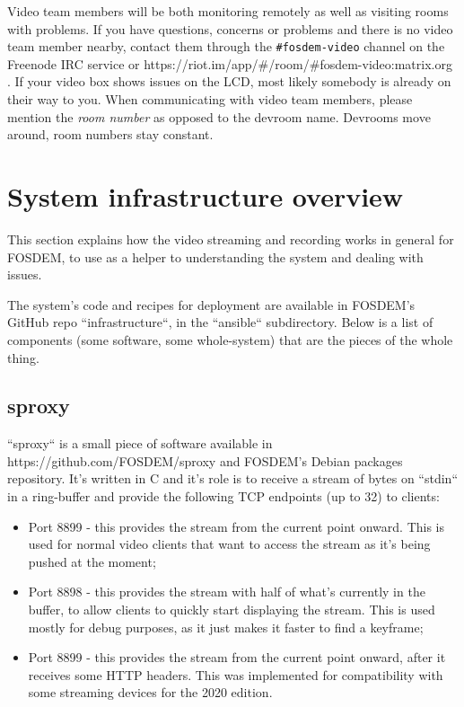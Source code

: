 \documentclass{article}
\begin{document}
Video team members will be both monitoring remotely as well as visiting rooms with problems. If you have questions, concerns or problems and there is no video team member nearby, contact them through the \texttt{\#fosdem-video} channel on the Freenode IRC service or https://riot.im/app/\#/room/\#fosdem-video:matrix.org . If your video box shows issues on the LCD, most likely somebody is already on their way to you. When communicating with video team members, please mention the \emph{room number} as opposed to the devroom name. Devrooms move around, room numbers stay constant.

\section{System infrastructure overview}

This section explains how the video streaming and recording works in general for FOSDEM, to use as a helper to understanding the system and dealing with issues.

The system's code and recipes for deployment are available in FOSDEM's GitHub repo ``infrastructure``, in the ``ansible`` subdirectory. Below is a list of components (some software, some whole-system) that are the pieces of the whole thing.

\subsection{sproxy}

``sproxy`` is a small piece of software available in https://github.com/FOSDEM/sproxy and FOSDEM's Debian packages repository. It's written in C and it's role is to receive a stream of bytes on ``stdin`` in a ring-buffer and provide the following TCP endpoints (up to 32) to clients:

\begin{itemize}
  \item Port 8899 - this provides the stream from the current point onward. This is used for normal video clients that want to access the stream as it's being pushed at the moment;
  \item Port 8898 - this provides the stream with half of what's currently in the buffer, to allow clients to quickly start displaying the stream. This is used mostly for debug purposes, as it just makes it faster to find a keyframe;
  \item Port 8899 - this provides the stream from the current point onward, after it receives some HTTP headers. This was implemented for compatibility with some streaming devices for the 2020 edition.
\end{itemize}
\end{document}
